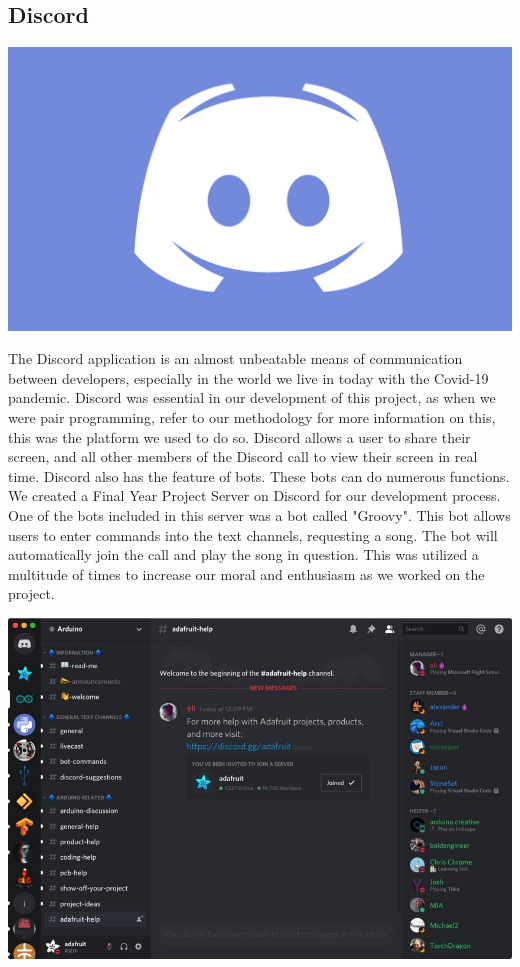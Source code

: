 \subsection{Discord}
\includegraphics[scale=0.15]{img/discord-logo.jpg} \par
The Discord application is an almost unbeatable means of communication between developers, especially in the world we live in today with the Covid-19 pandemic. Discord was essential in our development of this project, as when we were pair programming, refer to our methodology for more information on this, this was the platform we used to do so. Discord allows a user to share their screen, and all other members of the Discord call to view their screen in real time. Discord also has the feature of bots. These bots can do numerous functions. We created a Final Year Project Server on Discord for our development process. One of the bots included in this server was a bot called "Groovy". This bot allows users to enter commands into the text channels, requesting a song. The bot will automatically join the call and play the song in question. This was utilized a multitude of times to increase our moral and enthusiasm as we worked on the project. \par
\includegraphics[scale=0.5]{img/server.jpg}
\par

